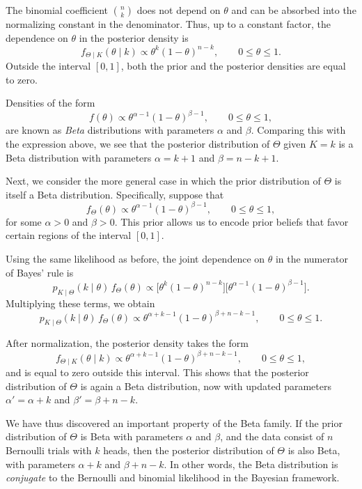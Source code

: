 The binomial coefficient \(\binom{n}{k}\) does not depend on \(\theta\) and can be absorbed into the normalizing constant in the denominator.  
Thus, up to a constant factor, the dependence on \(\theta\) in the posterior density is
\[
f_{\Theta \mid K}(\theta \mid k)
\propto
\theta^{k} (1 - \theta)^{n-k},
\qquad
0 \leq \theta \leq 1.
\]
Outside the interval \([0,1]\), both the prior and the posterior densities are equal to zero.  

Densities of the form
\[
f(\theta)
\propto
\theta^{\alpha - 1} (1 - \theta)^{\beta - 1},
\qquad
0 \leq \theta \leq 1,
\]
are known as \textit{Beta} distributions with parameters \(\alpha\) and \(\beta\).  
Comparing this with the expression above, we see that the posterior distribution of \(\Theta\) given \(K = k\) is a Beta distribution with parameters \(\alpha = k + 1\) and \(\beta = n - k + 1\).  

Next, we consider the more general case in which the prior distribution of \(\Theta\) is itself a Beta distribution.  
Specifically, suppose that
\[
f_{\Theta}(\theta)
\propto
\theta^{\alpha - 1} (1 - \theta)^{\beta - 1},
\qquad
0 \leq \theta \leq 1,
\]
for some \(\alpha > 0\) and \(\beta > 0\).  
This prior allows us to encode prior beliefs that favor certain regions of the interval \([0,1]\).  

Using the same likelihood as before, the joint dependence on \(\theta\) in the numerator of Bayes' rule is
\[
p_{K \mid \Theta}(k \mid \theta)\,f_{\Theta}(\theta)
\propto
\Big[\theta^{k} (1 - \theta)^{n-k}\Big]
\Big[\theta^{\alpha - 1} (1 - \theta)^{\beta - 1}\Big].
\]
Multiplying these terms, we obtain
\[
p_{K \mid \Theta}(k \mid \theta)\,f_{\Theta}(\theta)
\propto
\theta^{\alpha + k - 1} (1 - \theta)^{\beta + n - k - 1},
\qquad
0 \leq \theta \leq 1.
\]

After normalization, the posterior density takes the form
\[
f_{\Theta \mid K}(\theta \mid k)
\propto
\theta^{\alpha + k - 1} (1 - \theta)^{\beta + n - k - 1},
\qquad
0 \leq \theta \leq 1,
\]
and is equal to zero outside this interval.  
This shows that the posterior distribution of \(\Theta\) is again a Beta distribution, now with updated parameters \(\alpha' = \alpha + k\) and \(\beta' = \beta + n - k\).  

We have thus discovered an important property of the Beta family.  
If the prior distribution of \(\Theta\) is Beta with parameters \(\alpha\) and \(\beta\), and the data consist of \(n\) Bernoulli trials with \(k\) heads, then the posterior distribution of \(\Theta\) is also Beta, with parameters \(\alpha + k\) and \(\beta + n - k\).  
In other words, the Beta distribution is \textit{conjugate} to the Bernoulli and binomial likelihood in the Bayesian framework.  

